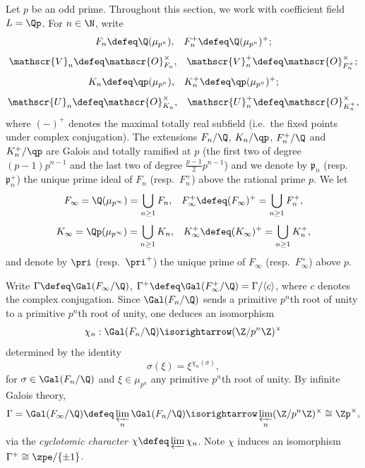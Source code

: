 \documentclass[a4paper,10pt, english, reqno]{smfart}
\newcommand{\GG}{\Gamma}
\numberwithin{equation}{section}
\begin{document}
Let $p$ be an odd prime. Throughout this section, we work with coefficient field $L = \Qp$. For $n \in \N$, write
\[ F_n \defeq \Q(\mu_{p^n}), \;\;\; F_n^+ \defeq \Q(\mu_{p^n})^+; \]
\[ \mathscr{V}_n \defeq \mathscr{O}_{F_n}^\times, \;\;\; \mathscr{V}_n^+ \defeq \mathscr{O}_{F_n^+}^\times; \]
\[ K_n \defeq \qp(\mu_{p^n}), \;\;\; K_n^+ \defeq \qp(\mu_{p^n})^+; \]
\[ \mathscr{U}_n \defeq \mathscr{O}_{K_n}^\times, \;\;\; \mathscr{U}_n^+ \defeq \mathscr{O}_{K_n^+}^\times, \]
where $(-)^+$ denotes the maximal totally real subfield (i.e.\ the fixed points under complex conjugation). The extensions $F_n / \Q$, $K_n / \qp$, $F^+_n / \Q$ and $K_n^+ / \qp$ are Galois and totally ramified at $p$ (the first two of degree $(p - 1)p^{n - 1}$ and the last two of degree $\frac{p - 1}{2} p^{n - 1}$) and we denote by $\mathfrak{p}_n$ (resp.\  $\mathfrak{p}_n^+$) the unique prime ideal of $F_n$ (resp.\ $F_n^+$) above the rational prime $p$. We let
\[ F_\infty = \Q(\mu_{p^\infty}) = \bigcup_{n\geq 1}F_n, \;\;\; F_\infty^+ \defeq (F_\infty)^+ = \bigcup_{n\geq 1}F_n^+, \]
\[ K_\infty = \Qp(\mu_{p^\infty}) = \bigcup_{n\geq 1}K_n, \;\;\; K_\infty^+ \defeq (K_\infty)^+ = \bigcup_{n\geq 1}K_n^+, \]
and denote  by $\pri$ (resp.\ $\pri^+$) the unique prime of $F_\infty$ (resp.\ $F^+_\infty$) above $p$. 

Write $\GG \defeq \Gal(F_\infty/\Q)$, $\GG^+ \defeq \Gal(F_\infty^+ / \Q) = \GG / \langle c \rangle$, where $c$ denotes the complex conjugation.  Since $\Gal(F_n/\Q)$ sends a primitive $p^n$th root of unity to a primitive $p^n$th root of unity, one deduces an isomorphism
\[ \chi_n : \Gal(F_n/\Q) \isorightarrow (\Z/p^n\Z)^\times\]
determined by the identity
\[\sigma(\xi) = \xi^{\chi_n(\sigma)},\]
for $\sigma \in \Gal(F_n/\Q)$ and $\xi \in \mu_{p^n}$ any primitive $p^n$th root of unity. By infinite Galois theory,
\begin{equation}\label{eq:cyclo char}
	 \GG = \Gal(F_\infty/\Q) \defeq \varprojlim_n \Gal(F_n/\Q) \isorightarrow \varprojlim_n (\Z/p^n\Z)^\times \cong \Zp^\times,
	 \end{equation}
via the \emph{cyclotomic character} $\chi \defeq \varprojlim \chi_n$. Note $\chi$ induces an isomorphism $\GG^+ \cong \zpe / \{ \pm 1 \}$. \\
\end{document}
